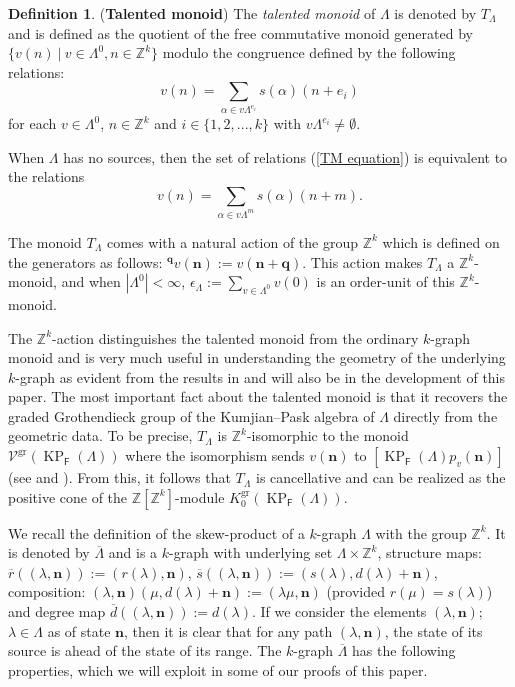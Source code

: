 \documentclass[a4paper,reqno,12pt]{amsart}
\numberwithin{equation}{section}
\theoremstyle{definition}
\newtheorem{dfn}[thm]{Definition}
\theoremstyle{remark}
\newcommand{\gr}{\operatorname{gr}}
\newcommand{\KP}{\operatorname{KP}}
\newcommand{\N}{\mathbf{n}}
\newcommand{\Q}{\mathbf{q}}
\begin{document}
\begin{dfn}\label{def talented monoid}
({\bf Talented monoid}) The \emph{talented monoid} of $\Lambda$ is denoted by $T_\Lambda$ and is defined as the quotient of the free commutative monoid generated by $\{v(n)~|~v\in \Lambda^0, n\in \mathbb{Z}^k\}$ modulo the congruence defined by the following relations:
\begin{equation}\label{TM equation}
    v(n)=\displaystyle{\sum_{\alpha\in v\Lambda^{e_i}}} s(\alpha)(n+e_i)
\end{equation}
for each $v\in \Lambda^0$, $n\in \mathbb{Z}^k$ and $i\in \{1,2,...,k\}$ with $v\Lambda^{e_i}\neq \emptyset$.   
\end{dfn}
When $\Lambda$ has no sources, then the set of relations (\ref{TM equation}) is equivalent to the relations 
\begin{equation*}
    v(n)=\displaystyle{\sum_{\alpha\in v\Lambda^m}} s(\alpha)(n+m).
\end{equation*}

The monoid $T_\Lambda$ comes with a natural action of the group $\mathbb{Z}^k$ which is defined on the generators as follows: $^\Q v(\N):=v(\N+\Q)$. This action makes $T_\Lambda$ a $\mathbb{Z}^k$-monoid, and when $|\Lambda^0|<\infty$, $\epsilon_\Lambda:=\displaystyle{\sum_{v\in \Lambda^0}} v(0)$ is an order-unit of this $\mathbb{Z}^k$-monoid. 

The $\mathbb{Z}^k$-action distinguishes the talented monoid from the ordinary $k$-graph monoid and is very much useful in understanding the geometry of the underlying $k$-graph as evident from the results in \cite{HMPS1} and will also be in the development of this paper. The most important fact about the talented monoid is that it recovers the graded Grothendieck group of the Kumjian--Pask algebra of $\Lambda$ directly from the geometric data. To be precise, $T_\Lambda$ is $\mathbb{Z}^k$-isomorphic to the monoid $\mathcal{V}^{\gr}(\KP_\mathsf{F}(\Lambda))$ where the isomorphism sends $v(\N)$ to $[\KP_\mathsf{F}(\Lambda)p_v (\N)]$ (see \cite[Lemma 5.6 \& Corollary 6.6]{AHLS} and \cite[Proposition 3.14]{HMPS1}). From this, it follows that $T_\Lambda$ is cancellative and can be realized as the positive cone of the $\mathbb{Z}[\mathbb{Z}^k]$-module $K_0^{\gr}(\KP_\mathsf{F}(\Lambda))$. 

We recall the definition of the skew-product of a $k$-graph $\Lambda$ with the group $\mathbb{Z}^k$. It is denoted by $\overline{\Lambda}$ and is a $k$-graph with underlying set $\Lambda\times \mathbb{Z}^k$, structure maps: $\overline{r}((\lambda,\N)):=(r(\lambda),\N)$, $\overline{s}((\lambda,\N)):=(s(\lambda),d(\lambda)+\N)$, composition: $(\lambda,\N)(\mu,d(\lambda)+\N):=(\lambda\mu,\N)$ (provided $r(\mu)=s(\lambda)$) and degree map $\overline{d}((\lambda,\N)):=d(\lambda)$. If we consider the elements $(\lambda,\N)$; $\lambda\in \Lambda$ as of state $\N$, then it is clear that for any path $(\lambda,\N)$, the state of its source is ahead of the state of its range. The $k$-graph $\overline{\Lambda}$ has the following properties, which we will exploit in some of our proofs of this paper.
\end{document}
